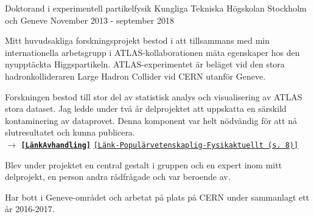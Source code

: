 


\begin{cventries}


\cventry
{Doktorand i experimentell partikelfysik} %
{Kungliga Tekniska H{\"o}gskolan} %
{Stockholm och Geneve} %
{November 2013 - september 2018} %
{ %
\begin{cvitems}
\item {Mitt huvudsakliga forskningsprojekt bestod i att tillsammans med min internationella arbetsgrupp i ATLAS-kollaborationen m{\"a}ta egenskaper hos den nyuppt{\"a}ckta Higgspartikeln. ATLAS-experimentet {\"a}r bel{\"a}get vid den stora hadronkollideraren Large Hadron Collider vid CERN utanf{\"o}r Geneve.
\item Forskningen bestod till stor del av statistisk analys och visualisering av ATLAS stora dataset. Jag ledde under tv{\aa} {\aa}r delprojektet att uppskatta en s{\"a}rskild kontaminering av dataprovet. Denna komponent var helt n{\"o}dv{\"a}ndig f{\"o}r att n{\aa} slutresultatet och kunna publicera. \\ 
$\rightarrow$  \href{http://kth.diva-portal.org/smash/record.jsf?pid=diva2\%3A1244395\&dswid=7018}{{\bf \texttt{[L{\"a}nkAvhandling]}}} \href{http://www.fysikersamfundet.se/wp-content/uploads/Fysikaktuellt3-18_Webb.pdf}{\texttt{[L{\"a}nk-Popul{\"a}rvetenskaplig-Fysikaktuellt (s. 8)]}} }
\item Blev under projektet en central gestalt i gruppen och en expert inom mitt delprojekt, en person andra r{\aa}dfr{\aa}gade och var beroende av.
\item {Har bott i Geneve-omr{\aa}det och arbetat p{\aa} plats p{\aa} CERN under sammanlagt ett {\aa}r 2016-2017.} %

\end{cvitems}}
\end{cventries}
